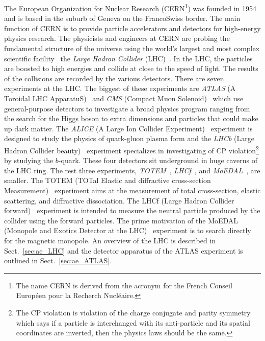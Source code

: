The European Organization for Nuclear Research (CERN\footnote{The name CERN is derived from the acronym for the French Conseil Europ\'{e}en pour la Recherch Nucl\'{e}aire.}) was founded in 1954 and is based in the suburb of Geneva on the Franco\textendash Swiss border.
The main function of CERN is to provide particle accelerators and detectors for high-energy physics research.
The physicists and engineers at CERN are probing the fundamental structure of the universe using the world's largest and most complex scientific facility \textemdash \ the \textit{Large Hadron Collider} (LHC)~\cite{Evans:2008zzb}.
In the LHC, the particles are boosted to high energies and collide at close to the speed of light.
The results of the collisions are recorded by the various detectors.
There are seven experiments at the LHC.
The biggest of these experiments are \textit{ATLAS} (A Toroidal LHC ApparatuS)~\cite{Aad:2008zzm} and \textit{CMS} (Compact Muon Solenoid)~\cite{Chatrchyan:2008aa} which use general-purpose detectors to investigate a broad physics program ranging from the search for the Higgs boson to extra dimensions and particles that could make up dark matter.
The \textit{ALICE} (A Large Ion Collider Experiment)~\cite{Aamodt:2008zz} experiment is designed to study the physics of quark-gluon plasma form and the \textit{LHCb} (Large Hadron Collider beauty)~\cite{Alves:2008zz} experiment specializes in investigating of CP violation\footnote{The CP violation is violation of the charge conjugate and parity symmetry which says if a particle is interchanged with its anti-particle and its spatial coordinates are inverted, then the physics laws should be the same.} by studying the $b$-quark.
These four detectors sit underground in huge caverns of the LHC ring.
The rest three experiments, \textit{TOTEM}~\cite{Anelli:2008zza}, \textit{LHCf}~\cite{Adriani:2008zz}, and \textit{MoEDAL}~\cite{Pinfold:2009oia}, are smaller.
The TOTEM (TOTal Elastic and diffractive cross-section Measurement)~\cite{Anelli:2008zza} experiment aims at the measurement of total cross-section, elastic scattering, and diffractive dissociation.
The LHCf (Large Hadron Collider forward)~\cite{Adriani:2008zz} experiment is intended to measure the neutral particle produced by the collider using the forward particles.
The prime motivation of the MoEDAL (Monopole and Exotics Detector at the LHC)~\cite{Pinfold:2009oia} experiment is to search directly for the magnetic monopole.
An overview of the LHC is described in Sect.~\ref{sec:ae_LHC} and the detector apparatus of the ATLAS experiment is outlined in Sect.~\ref{sec:ae_ATLAS}.

